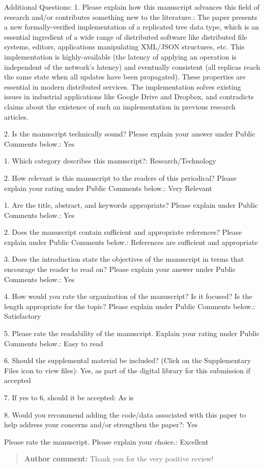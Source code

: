 \documentclass[10pt]{article}
\newcommand{\authorcomment}[1]{\begin{quote}\textbf{Author comment:} #1\end{quote}}
\begin{document}
\begin{spverbatim}
Additional Questions:
1.  Please explain how this manuscript advances this field of research and/or contributes something new to the literature.: The paper presents a new formally-verified implementation of a replicated tree data type, which is an essential ingredient of a wide range of distributed software like distributed file systems, editors, applications manipulating XML/JSON structures, etc. This implementation is highly-available (the latency of applying an operation is independent of the network's latency) and eventually consistent (all replicas reach the same state when all updates have been propagated). These properties are essential in modern distributed services. The implementation solves existing issues in industrial applications like Google Drive and Dropbox, and contradicts claims about the existence of such an implementation in previous research articles.

2. Is the manuscript technically sound? Please explain your answer under Public Comments below.: Yes

1. Which category describes this manuscript?: Research/Technology

2. How relevant is this manuscript to the readers of this periodical? Please explain your rating under Public Comments below.: Very Relevant

1. Are the title, abstract, and keywords appropriate? Please explain under Public Comments below.: Yes

2. Does the manuscript contain sufficient and appropriate references? Please explain under Public Comments below.: References are sufficient and appropriate

3. Does the introduction state the objectives of the manuscript in terms that encourage the reader to read on? Please explain your answer under Public Comments below.: Yes

4. How would you rate the organization of the manuscript? Is it focused? Is the length appropriate for the topic? Please explain under Public Comments below.: Satisfactory

5. Please rate the readability of the manuscript. Explain your rating under Public Comments below.: Easy to read

6. Should the supplemental material be included? (Click on the Supplementary Files icon to view files): Yes, as part of the digital library for this submission if accepted

7. If yes to 6, should it be accepted: As is

8. Would you recommend adding the code/data associated with this paper to help address your concerns and/or strengthen the paper?: Yes

Please rate the manuscript. Please explain your choice.: Excellent
\end{spverbatim}
\authorcomment{Thank you for the very positive review!}
\end{document}
